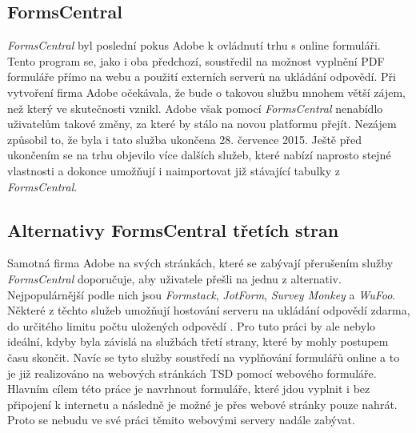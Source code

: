 \documentclass[czech,BP]{thesiskiv}
\begin{document}
\subsection{FormsCentral}
\emph{FormsCentral} byl poslední pokus Adobe k ovládnutí trhu s online formuláři. Tento program se, jako i oba předchozí, soustředil na možnost vyplnění PDF formuláře přímo na webu a použití externích serverů na ukládání odpovědí. Při vytvoření firma Adobe očekávala, že bude o takovou službu mnohem větší zájem, než který ve skutečnosti vznikl. Adobe však pomocí \emph{FormsCentral} nenabídlo uživatelům takové změny, za které by stálo na novou platformu přejít. Nezájem způsobil to, že byla i tato služba ukončena 28. července 2015. Ještě před ukončením se na trhu objevilo více dalších služeb, které nabízí naprosto stejné vlastnosti a dokonce umožňují i naimportovat již stávající tabulky z \emph{FormsCentral}\cite{Adobe_FormsCentral}.

\subsection{Alternativy FormsCentral třetích stran}
Samotná firma Adobe na svých stránkách, které se zabývají přerušením služby \emph{FormsCentral} doporučuje, aby uživatele přešli na jednu z alternativ. Nejpopulárnější podle nich jsou \emph{Formstack}, \emph{JotForm}, \emph{Survey Monkey} a \emph{WuFoo}. Některé z těchto služeb umožňují hostování serveru na ukládání odpovědí zdarma, do určitého limitu počtu uložených odpovědí \cite{Adobe_FormsCentral}. 
Pro tuto práci by ale nebylo ideální, kdyby byla závislá na službách třetí strany, které by mohly postupem času skončit. Navíc se tyto služby soustředí na vyplňování formulářů online a to je již realizováno na webových stránkách TSD pomocí webového formuláře. Hlavním cílem této práce je navrhnout formuláře, které jdou vyplnit i bez připojení k internetu a následně je možné je přes webové stránky pouze nahrát. Proto se nebudu ve své práci těmito webovými servery nadále zabývat.
\end{document}
